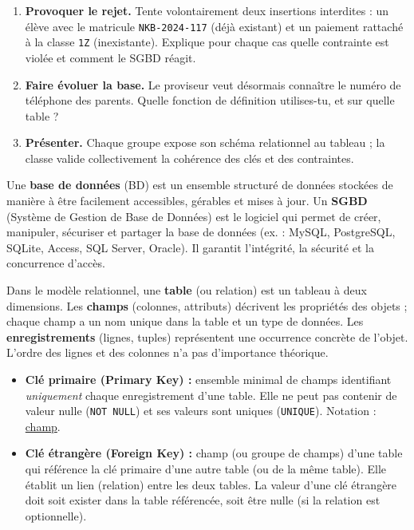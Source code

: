 \documentclass[11pt]{article}
\newcounter{popsec}
\newcounter{popsub}
\newcommand{\courssub}[1]{%
  \stepcounter{popsub}%
  \par\vspace{9pt}\noindent{\popxbold\fontsize{11.5}{13}\selectfont\color{popink}{\color{poporange}\thepopsec.\thepopsub}\hspace{6pt}#1}\par\nopagebreak\vspace{4pt}
}
\begin{document}
\begin{enumerate}
\item \textbf{Provoquer le rejet.} Tente volontairement deux insertions interdites : un élève avec le matricule \texttt{NKB-2024-117} (déjà existant) et un paiement rattaché à la classe \texttt{1Z} (inexistante). Explique pour chaque cas quelle contrainte est violée et comment le SGBD réagit.
\item \textbf{Faire évoluer la base.} Le proviseur veut désormais connaître le numéro de téléphone des parents. Quelle fonction de définition utilises-tu, et sur quelle table ?
\item \textbf{Présenter.} Chaque groupe expose son schéma relationnel au tableau ; la classe valide collectivement la cohérence des clés et des contraintes.
\end{enumerate}

\courssub{Ressources à mobiliser}

\begin{definition}
Une \textbf{base de données} (BD) est un ensemble structuré de données stockées de manière à être facilement accessibles, gérables et mises à jour. Un \textbf{SGBD} (Système de Gestion de Base de Données) est le logiciel qui permet de créer, manipuler, sécuriser et partager la base de données (ex. : MySQL, PostgreSQL, SQLite, Access, SQL Server, Oracle). Il garantit l'intégrité, la sécurité et la concurrence d'accès.
\end{definition}

\begin{definition}
Dans le modèle relationnel, une \textbf{table} (ou relation) est un tableau à deux dimensions. Les \textbf{champs} (colonnes, attributs) décrivent les propriétés des objets ; chaque champ a un nom unique dans la table et un type de données. Les \textbf{enregistrements} (lignes, tuples) représentent une occurrence concrète de l'objet. L'ordre des lignes et des colonnes n'a pas d'importance théorique.
\end{definition}

\begin{propriete}
\begin{itemize}
\item \textbf{Clé primaire (Primary Key) :} ensemble minimal de champs identifiant \emph{uniquement} chaque enregistrement d'une table. Elle ne peut pas contenir de valeur nulle (\texttt{NOT NULL}) et ses valeurs sont uniques (\texttt{UNIQUE}). Notation : \underline{champ}.
\item \textbf{Clé étrangère (Foreign Key) :} champ (ou groupe de champs) d'une table qui référence la clé primaire d'une autre table (ou de la même table). Elle établit un lien (relation) entre les deux tables. La valeur d'une clé étrangère doit soit exister dans la table référencée, soit être nulle (si la relation est optionnelle).
\end{itemize}
\end{propriete}
\end{document}
